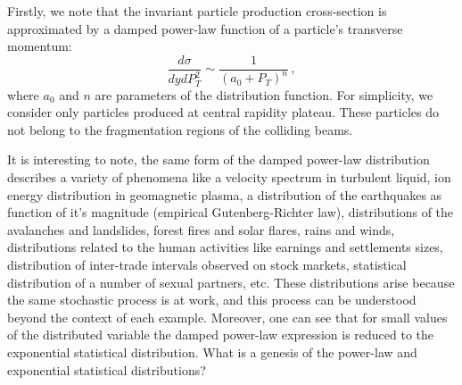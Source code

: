 \documentclass[10pt,twoside]{hsqcd}
\begin{document}
Firstly, we note that the invariant particle production cross-section is 
approximated by a damped power-law function of a particle's transverse 
momentum:
\begin{equation}
\frac{d\sigma}{dydP_T^2} \sim \frac{1}{(a_0 + P_T)^n}\,,
\label{pdf}
\end{equation}
where $a_0$ and $n$ are parameters of the distribution function. For 
simplicity, we consider only particles produced at central rapidity 
plateau. These particles do not belong to the fragmentation regions of the 
colliding beams.

It is interesting to note, the same form of the damped power-law 
distribution describes a variety of phenomena like a velocity spectrum in 
turbulent liquid, ion energy distribution in geomagnetic plasma,  a 
distribution of the earthquakes as function of it's magnitude (empirical 
Gutenberg-Richter law), distributions of the avalanches and landslides, 
forest fires and solar flares, rains and winds, distributions related to 
the human activities like earnings and settlements sizes, distribution of 
inter-trade intervals observed on stock markets, statistical distribution 
of a number of sexual partners, etc. 
These distributions arise because the same stochastic process is at work, 
and this process can be understood beyond the context of each example. 
Moreover, one can see that for small values of the distributed variable 
the damped power-law expression is reduced to the exponential statistical 
distribution. What is a genesis of the power-law and exponential 
statistical distributions?
\end{document}
